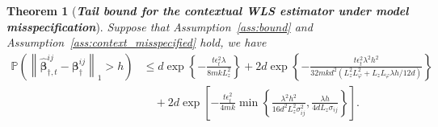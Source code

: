 \documentclass[12pt]{article}
\newtheorem{theorem}{Theorem}
\begin{document}
\begin{theorem}[\textbf{\emph{Tail bound for the contextual WLS estimator under model misspecification}}]
\label{conthm:wls_tail_misspecified}
Suppose that Assumption~\ref{ass:bound} and Assumption~\ref{ass:context_misspecified} hold, we have
\begin{align*}
\mathbb P
\left(
\left\|
\widehat{\bm\beta}_{\dagger,t}^{ij}
-
\bm\beta_\dagger^{ij}
\right\|_1
>h
\right)
&\le
d\exp
\left\{
-
\frac{t\epsilon_t^2\lambda}{8mkL_z^2}
\right\}
+
2d\exp
\left\{
-
\frac{t\epsilon_t^2\lambda^2h^2}{32mkd^2
\left(L_z^2L_\varphi^2
+ {L_zL_\varphi\lambda h}/{12d}
\right)
}
\right\}
\\
&\quad+
2d
\exp
\left[
-\frac{t\epsilon_t^2}{4mk}
\min
\left\{
\frac{
\lambda^2h^2}{16d^2L_z^2\sigma_{ij}^2},
\frac{
\lambda h}{4dL_z\sigma_{ij}}
\right\}
\right].
\end{align*}
\end{theorem}
\end{document}

